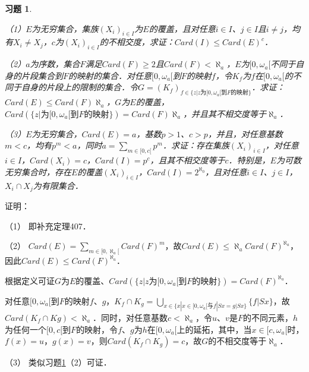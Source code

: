 \documentclass[12pt, a4paper, oneside]{book}
\newtheorem{exer}{习题}
\begin{document}
			\begin{exer}\label{exer180}
				\hfill\par
				（1）$E$为无穷集合，集族$(X_i)_{i\in I}$为$E$的覆盖，且对任意$i\in I$、$j\in I$且$i\neq j$，均有$X_i\neq X_j$，$c$为$(X_i)_{i\in I}$的不相交度，求证：$Card(I)\leq Card(E)^c$．
				\par
				（2）$a$为序数，集合$F$满足$Card(F)\geq 2$且$Card(F)<\aleph_a$，$E$为$[0, \omega_a[$不同于自身的片段集合到$F$的映射的集合．对任意$[0, \omega_a[$到$F$的映射$f$，令$K_f$为$f$在$[0, \omega_a[$的不同于自身的片段上的限制的集合．令$G=(K_f)_{f\in \{z|z\text{为}[0, \omega_a[\text{到}F\text{的映射}\}}$．求证：$Card(E)\leq Card(F)\aleph_a$，$G$为$E$的覆盖，$Card(\{z|\text{为}[0, \omega_a[\text{到}F\text{的映射}\})=Card(F)\aleph_a$，并且其不相交度等于$\aleph_a$．
				\par
				（3）$E$为无穷集合，$Card(E)=a$，基数$p>1$、$c>p$，并且，对任意基数$m<c$，均有$p^m<a$，同时$a=\sum\limits_{m\in [0, c[}p^m$．求证：存在集族$(X_i)_{i\in I}$，对任意$i\in I$，$Card(X_i)=c$，$Card(I)=p^c$，且其不相交度等于$c$．特别是，$E$为可数无穷集合时，存在$E$的覆盖$(X_i)_{i\in I}$，$Card(I)=2^{\aleph_0}$，且对任意$i\in I$、$j\in I$，$X_i\cap X_j$为有限集合．
			\end{exer}
			证明：
			\par
			（1）	即补充定理407．
			\par
			（2）	$Card(E)=\sum\limits_{m\in [0, \aleph_a[}Card(F)^m$，故$Card(E)\leq \aleph_aCard(F)^{\aleph_a}$，因此$Card(E)\leq Card(F)^{\aleph_a}$．
			\par
			根据定义可证$G$为$E$的覆盖、$Card(\{z|z\text{为}[0, \omega_a[\text{到}F\text{的映射}\})=Card(F)^{\aleph_a}$．
			\par
			对任意$[0, \omega_a[$到$F$的映射$f$、$g$，$K_f\cap K_g=\bigcup\limits_{x\in \{x|x\in [0, \omega_a[\text{与}f|Sx=g|Sx\}}\{f|Sx\}$，故$Card(K_f\cap Kg)<\aleph_a$．同时，对任意基数$c<\aleph_a$，令$u$、$v$是$F$的不同元素，$h$为任何一个$[0, c[$到$F$的映射，令$f$、$g$为$h$在$[0, \omega_a[$上的延拓，其中，当$x\in [c, \omega_a[$时，$f(x)=u$，$g(x)=v$，则$Card(K_f\cap K_g)=c$，故$G$的不相交度等于$\aleph_a$．
			\par
			（3）	类似习题\ref{exer180}（2）可证．
			
\end{document}
